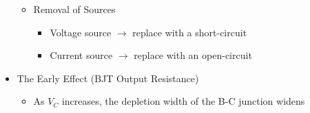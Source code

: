\begin{itemize}
\begin{itemize}
\begin{itemize}
        \end{itemize}

      \item Removal of Sources

        \begin{itemize}

          \item Voltage source $\to$ replace with a short-circuit

          \item Current source $\to$ replace with an open-circuit

        \end{itemize}

    \end{itemize}

  \item The Early Effect (BJT Output Resistance)

    \begin{itemize}

      \item As $V_C$ increases, the depletion width of the B-C junction widens

    \end{itemize}

\end{itemize}



